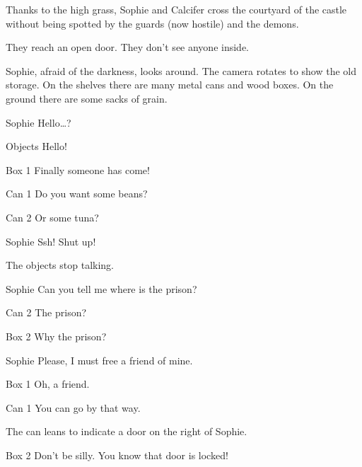 Thanks to the high grass, Sophie and Calcifer cross the courtyard of the castle without being spotted by the guards (now hostile) and the demons.

They reach an open door. They don’t see anyone inside.

\begin{screenplay}

Sophie, afraid of the darkness, looks around. The camera rotates to show the old storage. On the shelves there are many metal cans and wood boxes. On the ground there are some sacks of grain.

\begin{dialogue}{Sophie}
Hello…?
\end{dialogue}
\begin{dialogue}[cheerful]{Objects}
 Hello!
\end{dialogue}
\begin{dialogue}{Box 1}
 Finally someone has come!
\end{dialogue}
\begin{dialogue}{Can 1}
 Do you want some beans?
\end{dialogue}
\begin{dialogue}{Can 2}
Or some tuna?
\end{dialogue}
\begin{dialogue}[worried]{Sophie}
Ssh! Shut up!
\end{dialogue}
The objects stop talking.
\begin{dialogue}{Sophie}
Can you tell me where is the prison?
\end{dialogue}
\begin{dialogue}[surprised]{Can 2}
The prison?
\end{dialogue}
\begin{dialogue}[surprised]{Box 2}
Why the prison?
\end{dialogue}
\begin{dialogue}{Sophie}
Please, I must free a friend of mine.
\end{dialogue}
\begin{dialogue}{Box 1}
Oh, a friend.
\end{dialogue}
\begin{dialogue}{Can 1}
You can go by that way.
\end{dialogue}
The can leans to indicate a door on the right of Sophie.
\begin{dialogue}{Box 2}
Don't be silly. You know that door is locked!
\end{dialogue}

\end{screenplay}
